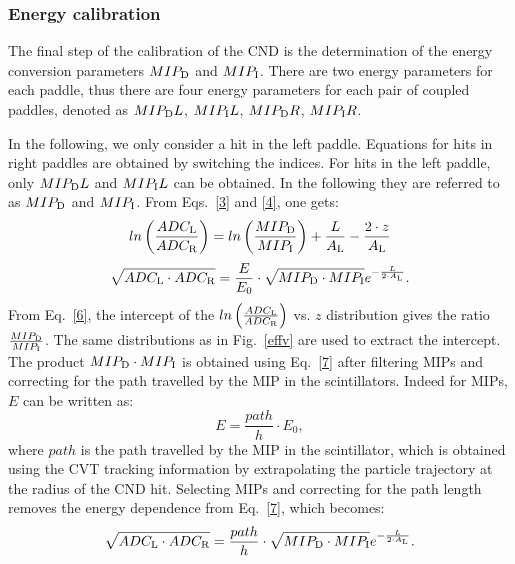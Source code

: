 \subsubsection{Energy calibration }\label{sec_energy_cal}

The final step of the calibration of the CND is the determination of the energy conversion parameters $MIP_{\rm{D}}$ and $MIP_{\rm{I}}$. There are two energy parameters for each paddle, thus there are four energy parameters for each pair of coupled paddles, denoted as $MIP_{\rm{D}}L$, $MIP_{\rm{I}}L$, $MIP_{\rm{D}}R$, $MIP_{\rm{I}}R$.

In the following, we only consider a hit in the left paddle. Equations for hits in right paddles are obtained by switching the indices. For hits in the left paddle, only $MIP_{\rm{D}}L$ and $MIP_{\rm{I}}L$ can be obtained. In the following they are referred to as $MIP_{\rm{D}}$ and $MIP_{\rm{I}}$. From Eqs.~\ref{3} and \ref{4}, one gets:
\begin{equation}
\label{6}
ln\left(\frac{ADC_{\rm{L}}}{ADC_{\rm{R}}}\right)=ln\left(\frac{MIP_{\rm{D}}}{MIP_{\rm{I}}}\right)+{\frac{L}{A_{\rm{L}}}}-\frac{2\cdot z}{A_{\rm{L}}}
\end{equation}
\begin{equation}
\label{7}
\sqrt{ADC_{\rm{L}}\cdot ADC_{\rm{R}}}=\frac{E}{E_0}\cdot \sqrt{MIP_{\rm{D}}\cdot MIP_{\rm{I}}} e^{-\frac{L}{2\cdot A_{\rm{L}}}}.
\end{equation}
From Eq.~\ref{6}, the intercept of the $ln\left(\frac{ADC_{\rm{L}}}{ADC_{\rm{R}}}\right)$ vs. $z$ distribution gives the ratio $\frac{MIP_{\rm{D}}}{MIP_{\rm{I}}}$. The same distributions as in Fig.~\ref{effv} are used to extract the intercept. The product $MIP_{\rm{D}}\cdot MIP_{\rm{I}}$ is obtained using Eq.~\ref{7} after filtering MIPs and correcting for the path travelled by the MIP in the scintillators. Indeed for MIPs, $E$ can be written as:
\begin{equation}
E=\frac{path}{h}\cdot E_0,
\end{equation}
where $path$ is the path travelled by the MIP in the scintillator, which is obtained using the CVT tracking information by extrapolating the particle trajectory at the radius of the CND hit.
Selecting MIPs and correcting for the path length removes the energy dependence from Eq.~\ref{7}, which becomes:
\begin{equation}
\sqrt{ADC_{\rm{L}}\cdot ADC_{\rm{R}}}=\frac{path}{h}\cdot \sqrt{MIP_{\rm{D}}\cdot MIP_{\rm{I}}} e^{-\frac{L}{2\cdot A_{\rm{L}}}} .
\end{equation}

